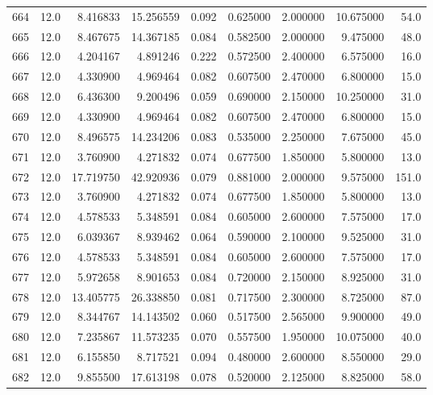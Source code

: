 \begin{tabular}{lrrrrrrrr}
664  &   12.0 &   8.416833 &  15.256559 &  0.092 &  0.625000 &  2.000000 &  10.675000 &   54.0 \\
665  &   12.0 &   8.467675 &  14.367185 &  0.084 &  0.582500 &  2.000000 &   9.475000 &   48.0 \\
666  &   12.0 &   4.204167 &   4.891246 &  0.222 &  0.572500 &  2.400000 &   6.575000 &   16.0 \\
667  &   12.0 &   4.330900 &   4.969464 &  0.082 &  0.607500 &  2.470000 &   6.800000 &   15.0 \\
668  &   12.0 &   6.436300 &   9.200496 &  0.059 &  0.690000 &  2.150000 &  10.250000 &   31.0 \\
669  &   12.0 &   4.330900 &   4.969464 &  0.082 &  0.607500 &  2.470000 &   6.800000 &   15.0 \\
670  &   12.0 &   8.496575 &  14.234206 &  0.083 &  0.535000 &  2.250000 &   7.675000 &   45.0 \\
671  &   12.0 &   3.760900 &   4.271832 &  0.074 &  0.677500 &  1.850000 &   5.800000 &   13.0 \\
672  &   12.0 &  17.719750 &  42.920936 &  0.079 &  0.881000 &  2.000000 &   9.575000 &  151.0 \\
673  &   12.0 &   3.760900 &   4.271832 &  0.074 &  0.677500 &  1.850000 &   5.800000 &   13.0 \\
674  &   12.0 &   4.578533 &   5.348591 &  0.084 &  0.605000 &  2.600000 &   7.575000 &   17.0 \\
675  &   12.0 &   6.039367 &   8.939462 &  0.064 &  0.590000 &  2.100000 &   9.525000 &   31.0 \\
676  &   12.0 &   4.578533 &   5.348591 &  0.084 &  0.605000 &  2.600000 &   7.575000 &   17.0 \\
677  &   12.0 &   5.972658 &   8.901653 &  0.084 &  0.720000 &  2.150000 &   8.925000 &   31.0 \\
678  &   12.0 &  13.405775 &  26.338850 &  0.081 &  0.717500 &  2.300000 &   8.725000 &   87.0 \\
679  &   12.0 &   8.344767 &  14.143502 &  0.060 &  0.517500 &  2.565000 &   9.900000 &   49.0 \\
680  &   12.0 &   7.235867 &  11.573235 &  0.070 &  0.557500 &  1.950000 &  10.075000 &   40.0 \\
681  &   12.0 &   6.155850 &   8.717521 &  0.094 &  0.480000 &  2.600000 &   8.550000 &   29.0 \\
682  &   12.0 &   9.855500 &  17.613198 &  0.078 &  0.520000 &  2.125000 &   8.825000 &   58.0 \\

\end{tabular}
